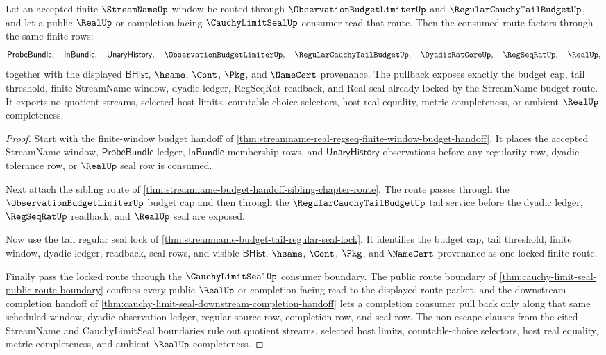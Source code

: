 \begin{theorem}
\label{thm:streamname-budget-cauchy-limit-seal-pullback}
Let an accepted finite $\StreamNameUp$ window be routed through
$\ObservationBudgetLimiterUp$ and $\RegularCauchyTailBudgetUp$, and let a
public $\RealUp$ or completion-facing $\CauchyLimitSealUp$ consumer read that
route. Then the consumed route factors through the same finite rows:
$$
\mathsf{ProbeBundle},\quad \mathsf{InBundle},\quad
\mathsf{UnaryHistory},\quad \ObservationBudgetLimiterUp,\quad
\RegularCauchyTailBudgetUp,\quad \DyadicRatCoreUp,\quad
\RegSeqRatUp,\quad \RealUp,
$$
together with the displayed $\mathsf{BHist}$, $\hsame$, $\Cont$, $\Pkg$, and
$\NameCert$ provenance. The pullback exposes exactly the budget cap, tail
threshold, finite StreamName window, dyadic ledger, RegSeqRat readback, and
Real seal already locked by the StreamName budget route. It exports no quotient
streams, selected host limits, countable-choice selectors, host real equality,
metric completeness, or ambient $\RealUp$ completeness.
\end{theorem}
\begin{proof}
Start with the finite-window budget handoff of
\autoref{thm:streamname-real-regseq-finite-window-budget-handoff}. It places
the accepted StreamName window, $\mathsf{ProbeBundle}$ ledger,
$\mathsf{InBundle}$ membership rows, and $\mathsf{UnaryHistory}$ observations
before any regularity row, dyadic tolerance row, or $\RealUp$ seal row is
consumed.

Next attach the sibling route of
\autoref{thm:streamname-budget-handoff-sibling-chapter-route}. The route passes
through the $\ObservationBudgetLimiterUp$ budget cap and then through the
$\RegularCauchyTailBudgetUp$ tail service before the dyadic ledger,
$\RegSeqRatUp$ readback, and $\RealUp$ seal are exposed.

Now use the tail regular seal lock of
\autoref{thm:streamname-budget-tail-regular-seal-lock}. It identifies the
budget cap, tail threshold, finite window, dyadic ledger, readback, seal rows,
and visible $\mathsf{BHist}$, $\hsame$, $\Cont$, $\Pkg$, and $\NameCert$
provenance as one locked finite route.

Finally pass the locked route through the $\CauchyLimitSealUp$ consumer
boundary. The public route boundary of
\autoref{thm:cauchy-limit-seal-public-route-boundary} confines every public
$\RealUp$ or completion-facing read to the displayed route packet, and the
downstream completion handoff of
\autoref{thm:cauchy-limit-seal-downstream-completion-handoff} lets a completion
consumer pull back only along that same scheduled window, dyadic observation
ledger, regular source row, completion row, and seal row. The non-escape
clauses from the cited StreamName and CauchyLimitSeal boundaries rule out
quotient streams, selected host limits, countable-choice selectors, host real
equality, metric completeness, and ambient $\RealUp$ completeness.
\end{proof}

